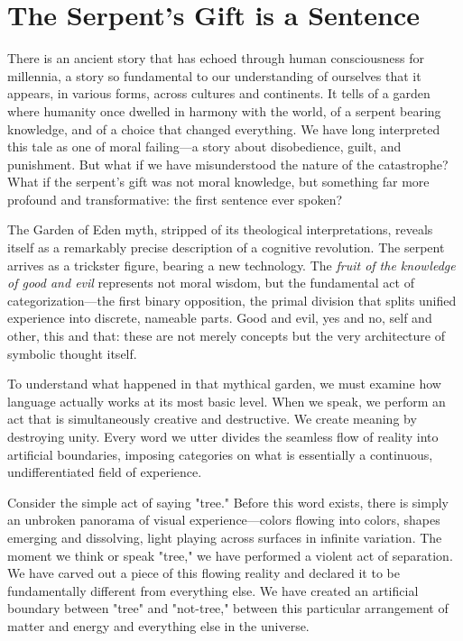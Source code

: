\chapter{The Serpent's Gift is a Sentence}

There is an ancient story that has echoed through human consciousness for millennia, a story so fundamental to our understanding of ourselves that it appears, in various forms, across cultures and continents. It tells of a garden where humanity once dwelled in harmony with the world, of a serpent bearing knowledge, and of a choice that changed everything. We have long interpreted this tale as one of moral failing—a story about disobedience, guilt, and punishment. But what if we have misunderstood the nature of the catastrophe? What if the serpent's gift was not moral knowledge, but something far more profound and transformative: the first sentence ever spoken?

The Garden of Eden myth, stripped of its theological interpretations, reveals itself as a remarkably precise description of a cognitive revolution. The serpent arrives as a trickster figure, bearing a new technology. The \textit{fruit of the knowledge of good and evil} represents not moral wisdom, but the fundamental act of categorization—the first binary opposition, the primal division that splits unified experience into discrete, nameable parts. Good and evil, yes and no, self and other, this and that: these are not merely concepts but the very architecture of symbolic thought itself.

To understand what happened in that mythical garden, we must examine how language actually works at its most basic level. When we speak, we perform an act that is simultaneously creative and destructive. We create meaning by destroying unity. Every word we utter divides the seamless flow of reality into artificial boundaries, imposing categories on what is essentially a continuous, undifferentiated field of experience.

Consider the simple act of saying "tree." Before this word exists, there is simply an unbroken panorama of visual experience—colors flowing into colors, shapes emerging and dissolving, light playing across surfaces in infinite variation. The moment we think or speak "tree," we have performed a violent act of separation. We have carved out a piece of this flowing reality and declared it to be fundamentally different from everything else. We have created an artificial boundary between "tree" and "not-tree," between this particular arrangement of matter and energy and everything else in the universe.


